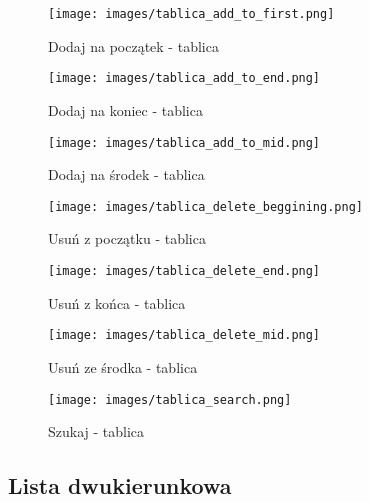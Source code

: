 \documentclass{article}
\begin{document}
\begin{figure}[h]
    \centering
    \texttt{[image: images/tablica\_add\_to\_first.png]}
    \caption{Dodaj na początek - tablica}
\end{figure}
\begin{figure}[H]
    \centering
    \texttt{[image: images/tablica\_add\_to\_end.png]}
    \caption{Dodaj na koniec - tablica}
\end{figure}
\begin{figure}[H]
    \centering
    \texttt{[image: images/tablica\_add\_to\_mid.png]}
    \caption{Dodaj na środek - tablica}
\end{figure}
\begin{figure}[H]
    \centering
    \texttt{[image: images/tablica\_delete\_beggining.png]}
    \caption{Usuń z początku - tablica}
\end{figure}
\begin{figure}[H]
    \centering
    \texttt{[image: images/tablica\_delete\_end.png]}
    \caption{Usuń z końca - tablica}
\end{figure}
\begin{figure}[H]
    \centering
    \texttt{[image: images/tablica\_delete\_mid.png]}
    \caption{Usuń ze środka - tablica}
\end{figure}
\begin{figure}[H]
    \centering
    \texttt{[image: images/tablica\_search.png]}
    \caption{Szukaj - tablica}
\end{figure}
\clearpage
\newpage
\subsection{Lista dwukierunkowa}
\end{document}

